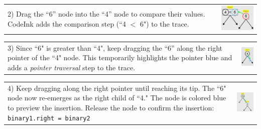 \noindent \begin{tabular}{m{4.6cm} m{3.4cm}}

2) Drag the ``6'' node into the ``4'' node to compare their values.
CodeInk adds the comparison step (``4 $<$ 6") to the trace.

& \includegraphics[width=3.4cm]{img/examples/bst-2.png}
\end{tabular}

\noindent \begin{tabular}{m{6.2cm} m{1.8cm}}

3) Since ``6" is greater than ``4", keep dragging the ``6'' along the
right pointer of the ``4" node. This temporarily highlights the pointer
blue and adds a \emph{pointer traversal} step to the trace.

& \includegraphics[width=1.8cm]{img/examples/bst-3.png}
\end{tabular}

\noindent \begin{tabular}{m{4.6cm} m{3.4cm}}

4) Keep dragging along the right pointer until reaching its tip. The
``6" node now re-emerges as the right child of ``4." The node is colored blue to
preview the insertion. Release the node to confirm the insertion:
\texttt{binary1.right = binary2}

& \includegraphics[width=3.4cm]{img/examples/bst-4.png}
\end{tabular}

